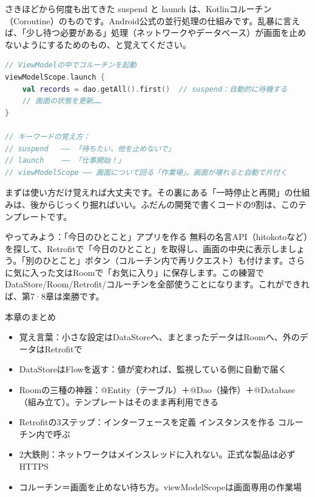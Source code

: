 
さきほどから何度も出てきた suspend と launch は、Kotlinコルーチン（Coroutine）のものです。Android公式の並行処理の仕組みです。乱暴に言えば、「少し待つ必要がある」処理（ネットワークやデータベース）が画面を止めないようにするためのもの、と覚えてください。

\begin{lstlisting}[language=Kotlin]
// ViewModelの中でコルーチンを起動
viewModelScope.launch {
    val records = dao.getAll().first()  // suspend：自動的に待機する
    // 画面の状態を更新……
}

// キーワードの覚え方：
// suspend   —— 「待ちたい、他を止めないで」
// launch    —— 「仕事開始！」
// viewModelScope —— 画面について回る「作業場」。画面が壊れると自動で片付く
\end{lstlisting}

まずは使い方だけ覚えれば大丈夫です。その裏にある「一時停止と再開」の仕組みは、後からじっくり掘ればいい。ふだんの開発で書くコードの9割は、このテンプレートです。

\begin{tcbpractice}{やってみよう：「今日のひとこと」アプリを作る}
無料の名言API（hitokotoなど）を探して、Retrofitで「今日のひとこと」を取得し、画面の中央に表示しましょう。「別のひとこと」ボタン（コルーチン内で再リクエスト）も付けます。さらに気に入った文はRoomで「お気に入り」に保存します。この練習でDataStore/Room/Retrofit/コルーチンを全部使うことになります。これができれば、第7·8章は楽勝です。

\end{tcbpractice}

\begin{tcbsummary}{本章のまとめ}
\begin{itemize}
  \item 覚え言葉：小さな設定はDataStoreへ、まとまったデータはRoomへ、外のデータはRetrofitで
  \item DataStoreはFlowを返す：値が変われば、監視している側に自動で届く
  \item Roomの三種の神器：@Entity（テーブル）＋@Dao（操作）＋@Database（組み立て）。テンプレートはそのまま再利用できる
  \item Retrofitの3ステップ：インターフェースを定義 インスタンスを作る コルーチン内で呼ぶ
  \item 2大鉄則：ネットワークはメインスレッドに入れない。正式な製品は必ずHTTPS
  \item コルーチン＝画面を止めない待ち方。viewModelScopeは画面専用の作業場
\end{itemize}

\end{tcbsummary}

